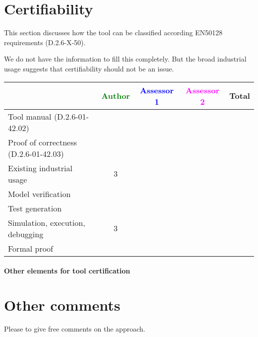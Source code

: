 \section{Certifiability}

This section discusses how the tool can be classified according EN50128 requirements (D.2.6-X-50).

\begin{author_comment}
  We do not have the information to fill this completely. But the broad industrial usage suggests that certifiability should not be an issue.
\end{author_comment}

\begin{tabular}{|l | c | c | c | c|}
\hline
& \textcolor{green}{Author} & \textcolor{blue}{Assessor 1} & \textcolor{magenta}{Assessor 2} & Total \\
\hline
Tool manual (D.2.6-01-42.02) & & & & \\
\hline
Proof of correctness (D.2.6-01-42.03) & & & & \\
\hline
Existing industrial usage &3 & & & \\
\hline
Model verification & & & & \\
\hline
Test generation & & & & \\
\hline
Simulation, execution, debugging &3 & & & \\
\hline
Formal proof & & & & \\
\hline
\end{tabular}

\paragraph{Other elements for tool certification}

\section{Other comments}
Please to give free comments on the approach.



